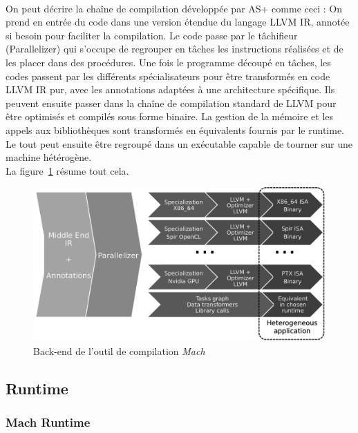 \paragraph{}
On peut décrire la chaîne de compilation développée par AS+ comme ceci : On
prend en entrée du code dans une version étendue du langage LLVM IR, annotée si
besoin pour faciliter la compilation. Le code passe par le tâchifieur
(Parallelizer) qui s'occupe de regrouper en tâches les instructions réalisées et
de les placer dans des procédures. Une fois le programme découpé en tâches, les
codes passent par les différents spécialisateurs pour être transformés en code
LLVM IR pur, avec les annotations adaptées à une architecture spécifique. Ils
peuvent ensuite passer dans la chaîne de compilation standard de LLVM pour être
optimisés et compilés sous forme binaire. La gestion de la mémoire et les appels
aux bibliothèques sont transformés en équivalents fournis par le runtime. Le
tout peut ensuite être regroupé dans un exécutable capable de tourner sur une
machine hétérogène.\\
La figure~\ref{backend_mach} résume tout cela.

\begin{figure}[h!]
   \begin{center}
      \includegraphics[width=135mm]{./images/backend_mach.png}
   \end{center}
   \caption{Back-end de l'outil de compilation \emph{Mach}~\cite{toolchain_fr}}
   \label{backend_mach}
\end{figure}

\subsection{Runtime}
\subsubsection{Mach Runtime}
